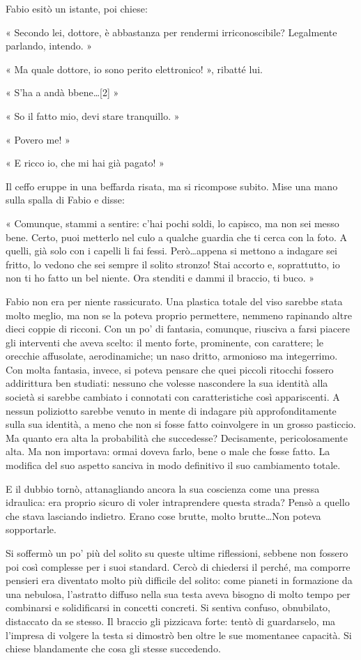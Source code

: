 Fabio esitò un istante, poi chiese:

« Secondo lei, dottore, è abbastanza per rendermi irriconoscibile? Legalmente parlando, intendo. »

« Ma quale dottore, io sono perito elettronico! », ribatté lui.

« S'ha a andà bbene\ldots [2] »

« So il fatto mio, devi stare tranquillo. »

« Povero me! »

« E ricco io, che mi hai già pagato! »

Il ceffo eruppe in una beffarda risata, ma si ricompose subito. Mise una mano sulla spalla di Fabio e disse:

« Comunque, stammi a sentire: c'hai pochi soldi, lo capisco, ma non sei messo bene. Certo, puoi metterlo nel culo a qualche guardia che ti cerca con la foto. A quelli, già solo con i capelli li fai fessi. Però\ldots appena si mettono a indagare sei fritto, lo vedono che sei sempre il solito stronzo! Stai accorto e, soprattutto, io non ti ho fatto un bel niente. Ora stenditi e dammi il braccio, ti buco. »

Fabio non era per niente rassicurato. Una plastica totale del viso sarebbe stata molto meglio, ma non se la poteva proprio permettere, nemmeno rapinando altre dieci coppie di ricconi. Con un po' di fantasia, comunque, riusciva a farsi piacere gli interventi che aveva scelto: il mento forte, prominente, con carattere; le orecchie affusolate, aerodinamiche; un naso dritto, armonioso ma integerrimo. Con molta fantasia, invece, si poteva pensare che quei piccoli ritocchi fossero addirittura ben studiati: nessuno che volesse nascondere la sua identità alla società si sarebbe cambiato i connotati con caratteristiche così appariscenti. A nessun poliziotto sarebbe venuto in mente di indagare più approfonditamente sulla sua identità, a meno che non si fosse fatto coinvolgere in un grosso pasticcio. Ma quanto era alta la probabilità che succedesse? Decisamente, pericolosamente alta. Ma non importava: ormai doveva farlo, bene o male che fosse fatto. La modifica del suo aspetto sanciva in modo definitivo il suo cambiamento totale.

E il dubbio tornò, attanagliando ancora la sua coscienza come una pressa idraulica: era proprio sicuro di voler intraprendere questa strada? Pensò a quello che stava lasciando indietro. Erano cose brutte, molto brutte\ldots Non poteva sopportarle.

Si soffermò un po' più del solito su queste ultime riflessioni, sebbene non fossero poi così complesse per i suoi standard. Cercò di chiedersi il perché, ma comporre pensieri era diventato molto più difficile del solito: come pianeti in formazione da una nebulosa, l'astratto diffuso nella sua testa aveva bisogno di molto tempo per combinarsi e solidificarsi in concetti concreti. Si sentiva confuso, obnubilato, distaccato da se stesso. Il braccio gli pizzicava forte: tentò di guardarselo, ma l'impresa di volgere la testa si dimostrò ben oltre le sue momentanee capacità. Si chiese blandamente che cosa gli stesse succedendo.

